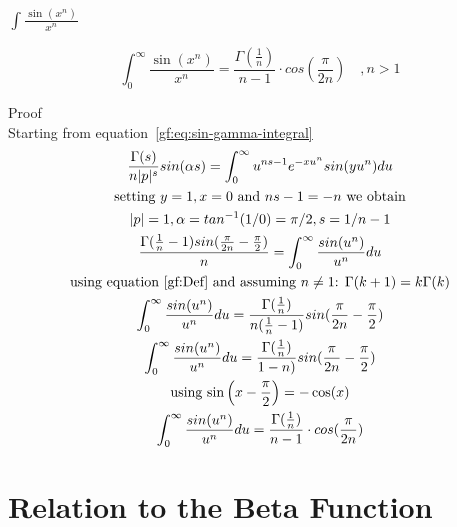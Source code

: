 \documentclass[a4paper]{article}
\begin{document}
    \subsubsection{\texorpdfstring{$\int \frac{\sin(x^n)}{x^n}$}{Integral of sin(x^n)/x^n}}

    \begin{theorem}
        \begin{equation}
            \boxed{
                \int_{0}^{\infty} \frac{\sin(x^n)}{x^n} = \frac{\Gamma(\frac{1}{n})}{n-1} \cdot cos(\frac{\pi}{2n})
                \quad ,   n > 1
            }\label{gf:eq:equation22}
        \end{equation}

        Proof
        \\
        Starting from equation~\ref{gf:eq:sin-gamma-integral}
        \begin{gather*}
            \frac{\Gamma(s)}{n |p|^s} sin(\alpha s)= \int_{0}^{\infty} u^{ns -1} e^{-x u^{n}} sin(y u^n) du
            \\
            \text{setting $y=1, x=0$ and $ns -1 = -n$ we obtain}
            \\
            |p| = 1, \alpha = tan^{-1}(1/0) = \pi/2, s = 1/n -1
            \\
            \frac{\Gamma(\frac{1}{n} - 1) sin(\frac{\pi}{2n} - \frac{\pi}{2})}{n} = \int_{0}^{\infty} \frac{sin(u^n)}{u^n} du
            \\
            \text{using equation~\ref{gf:Def} and assuming $n \neq 1$: } \Gamma(k+1) = k \Gamma(k)
            \\
            \int_{0}^{\infty} \frac{sin(u^n)}{u^n} du = \frac{\Gamma(\frac{1}{n})}{n (\frac{1}{n} -1 ) }  sin(\frac{\pi}{2n} - \frac{\pi}{2})
            \\
            \int_{0}^{\infty} \frac{sin(u^n)}{u^n} du = \frac{\Gamma(\frac{1}{n})}{1 - n )}  sin(\frac{\pi}{2n} - \frac{\pi}{2})
            \\
            \text{using $\sin\left(x - \frac{\pi}{2}\right) = - \cos(x)$}
            \\
            \int_{0}^{\infty} \frac{sin(u^n)}{u^n} du = \frac{\Gamma(\frac{1}{n})}{n-1} \cdot cos(\frac{\pi}{2n})
        \end{gather*}
    \end{theorem}

    \pagebreak


    \section{Relation to the Beta Function}\label{gf:sec:relation-to-the-beta-function}
\end{document}
